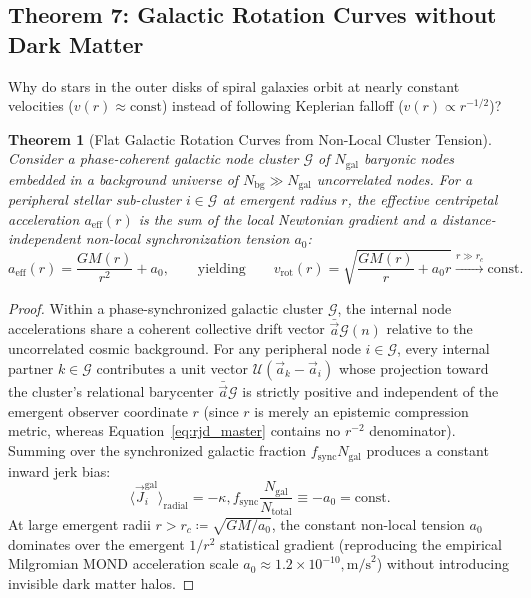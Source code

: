 \documentclass[11pt,a4paper]{article}
\theoremstyle{plain}
\newtheorem{theorem}{Theorem}[section]
\theoremstyle{definition}
\theoremstyle{remark}
\newcommand{\Jerk}{\vec{J}}
\newcommand{\Acc}{\vec{a}}
\begin{document}
\subsection{Theorem 7: Galactic Rotation Curves without Dark Matter}
Why do stars in the outer disks of spiral galaxies orbit at nearly constant velocities ($v(r) \approx \text{const}$) instead of following Keplerian falloff ($v(r) \propto r^{-1/2}$)?
\begin{theorem}[Flat Galactic Rotation Curves from Non-Local Cluster Tension]
\label{thm:dark_matter}
Consider a phase-coherent galactic node cluster $\mathcal{G}$ of $N_{\mathrm{gal}}$ baryonic nodes embedded in a background universe of $N_{\mathrm{bg}} \gg N_{\mathrm{gal}}$ uncorrelated nodes. For a peripheral stellar sub-cluster $i \in \mathcal{G}$ at emergent radius $r$, the effective centripetal acceleration $a_{\mathrm{eff}}(r)$ is the sum of the local Newtonian gradient and a distance-independent non-local synchronization tension $a_0$:
\begin{equation}
a_{\mathrm{eff}}(r) = \frac{G M(r)}{r^2} + a_0, \qquad \text{yielding} \qquad v_{\mathrm{rot}}(r) = \sqrt{\frac{G M(r)}{r} + a_0 r} \xrightarrow{r \gg r_c} \text{const.}
\end{equation}
\end{theorem}
\begin{proof}
Within a phase-synchronized galactic cluster $\mathcal{G}$, the internal node accelerations share a coherent collective drift vector $\bar{\Acc}{\mathcal{G}}(n)$ relative to the uncorrelated cosmic background. For any peripheral node $i \in \mathcal{G}$, every internal partner $k \in \mathcal{G}$ contributes a unit vector $\mathcal{U}(\Acc_k - \Acc_i)$ whose projection toward the cluster's relational barycenter $\bar{\Acc}{\mathcal{G}}$ is strictly positive and independent of the emergent observer coordinate $r$ (since $r$ is merely an epistemic compression metric, whereas Equation~\eqref{eq:rjd_master} contains no $r^{-2}$ denominator). Summing over the synchronized galactic fraction $f_{\mathrm{sync}} N_{\mathrm{gal}}$ produces a constant inward jerk bias:
\begin{equation}
\langle \Jerk_i^{\mathrm{gal}} \rangle_{\mathrm{radial}} = -\kappa , f_{\mathrm{sync}} \frac{N_{\mathrm{gal}}}{N_{\mathrm{total}}} \equiv -a_0 = \text{const.}
\end{equation}
At large emergent radii $r > r_c \coloneqq \sqrt{G M / a_0}$, the constant non-local tension $a_0$ dominates over the emergent $1/r^2$ statistical gradient (reproducing the empirical Milgromian MOND acceleration scale $a_0 \approx 1.2 \times 10^{-10},\text{m/s}^2$) without introducing invisible dark matter halos.
\end{proof}
\end{document}
